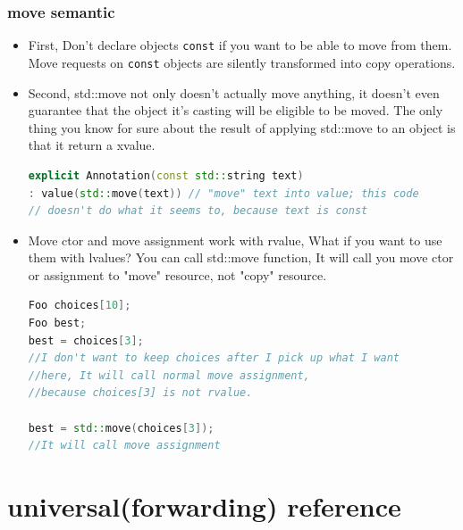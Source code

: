 \documentclass[a4paper,12pt,twoside]{book}
\begin{document}
\subsubsection{move semantic}
\begin{itemize}

\item First, Don't declare objects \texttt{const} if you want to be able to move from them. Move requests on \texttt{const} objects are silently transformed into copy operations.

\item Second, std::move not only doesn't actually move anything, it doesn't even guarantee that the object it's casting will be eligible to be moved. The only thing you know for sure about the result of applying std::move to an object is that it return a xvalue.

\begin{lstlisting}[frame=single, language=c++]
explicit Annotation(const std::string text)
: value(std::move(text)) // "move" text into value; this code
// doesn't do what it seems to, because text is const
\end{lstlisting}


\item Move ctor and move assignment work with rvalue, What if you want to use them with lvalues? You can call std::move function, It will call you move ctor or assignment to "move" resource, not "copy" resource.
\begin{lstlisting}[frame=single, language=c++]
Foo choices[10];
Foo best;
best = choices[3];
//I don't want to keep choices after I pick up what I want
//here, It will call normal move assignment,
//because choices[3] is not rvalue.

best = std::move(choices[3]);
//It will call move assignment
\end{lstlisting}
\end{itemize}



\section{universal(forwarding) reference }
\end{document}
